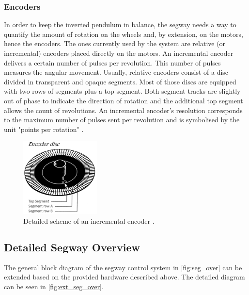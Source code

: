 \subsubsection{Encoders}\label{subsec:preEncoder}
In order to keep the inverted pendulum in balance, the segway needs a way to quantify the amount of rotation on the wheels and, by extension, on the motors, hence the encoders. The ones currently used by the system are relative (or incremental) encoders placed directly on the motors.
An incremental encoder delivers a certain number of pulses per revolution. This number of pulses measures the angular movement.
Usually, relative encoders consist of a disc divided in transparent and opaque segments. Most of those discs are equipped with two rows of segments plus a top segment. Both segment tracks are slightly out of phase to indicate the direction of rotation and the additional top segment allows the count of revolutions.
An incremental encoder's resolution corresponds to the maximum number of pulses sent per revolution and is symbolised by the unit "points per rotation" \citep{IncEnc}.
\vspace{-1 cm}
\begin{figure}[H]
	\centering
	\includegraphics[width=0.36\textwidth]{figures/Encoder.jpg}
	\caption{Detailed scheme of an incremental encoder \citep{IncEnc}.}
	\label{fig:incremental_encoders}
\end{figure}


\newpage
\subsection{Detailed Segway Overview}
The general block diagram of the segway control system in \autoref{fig:seg_over} can be extended based on the provided hardware described above. The detailed diagram can be seen in \autoref{fig:ext_seg_over}.

